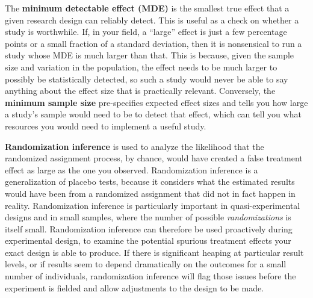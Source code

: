 The \textbf{minimum detectable effect (MDE)}
is the smallest true effect that a given research design can reliably detect.
This is useful as a check on whether a study is worthwhile.
If, in your field, a ``large'' effect is just a few percentage points
or a small fraction of a standard deviation,
then it is nonsensical to run a study whose MDE is much larger than that.
This is because, given the sample size and variation in the population,
the effect needs to be much larger to possibly be statistically detected,
so such a study would never be able to say anything about the effect size that is practically relevant.
Conversely, the \textbf{minimum sample size} pre-specifies expected effect sizes
and tells you how large a study's sample would need to be to detect that effect,
which can tell you what resources you would need 
to implement a useful study.

\textbf{Randomization inference} 
is used to analyze the likelihood
that the randomized assignment process, by chance,
would have created a false treatment effect as large as the one you observed.
Randomization inference is a generalization of placebo tests,
because it considers what the estimated results would have been
from a randomized assignment that did not in fact happen in reality.
Randomization inference is particularly important
in quasi-experimental designs and in small samples,
where the number of possible \textit{randomizations} is itself small.
Randomization inference can therefore be used proactively during experimental design,
to examine the potential spurious treatment effects your exact design is able to produce.
If there is significant heaping at particular result levels,
or if results seem to depend dramatically on the outcomes for a small number of individuals,
randomization inference will flag those issues before the experiment is fielded
and allow adjustments to the design to be made.
